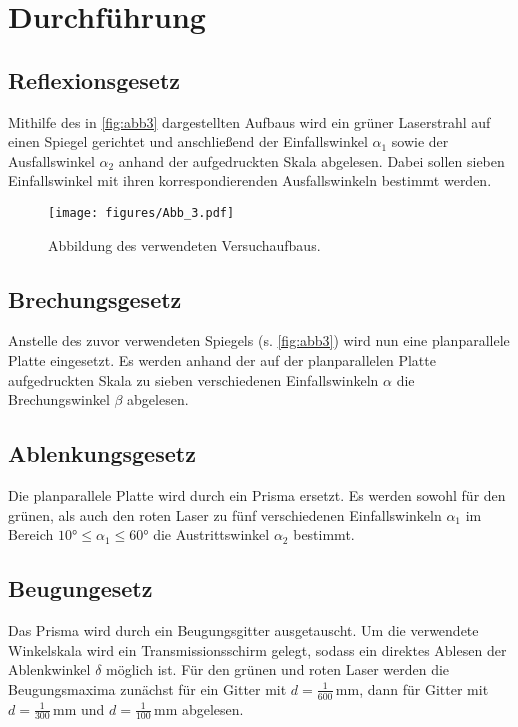 \section{Durchführung}
\label{sec:Durchführung}

\subsection*{Reflexionsgesetz}

Mithilfe des in \autoref{fig:abb3} dargestellten Aufbaus wird ein grüner Laserstrahl auf einen Spiegel gerichtet und anschließend der Einfallswinkel $\alpha_1$ sowie der Ausfallswinkel $\alpha_2$ anhand
der aufgedruckten Skala abgelesen. Dabei sollen sieben Einfallswinkel mit ihren korrespondierenden Ausfallswinkeln bestimmt werden.

\begin{figure}
    \centering
    \texttt{[image: figures/Abb\_3.pdf]}
    \caption{Abbildung des verwendeten Versuchaufbaus\cite{ap02}.}
    \label{fig:abb3}
\end{figure}

\subsection*{Brechungsgesetz}

Anstelle des zuvor verwendeten Spiegels (s. \autoref{fig:abb3}) wird nun eine planparallele Platte eingesetzt.
Es werden anhand der auf der planparallelen Platte aufgedruckten Skala zu sieben verschiedenen Einfallswinkeln $\alpha$ die Brechungswinkel $\beta$ abgelesen.


\subsection*{Ablenkungsgesetz}

Die planparallele Platte wird durch ein Prisma ersetzt.
Es werden sowohl für den grünen, als auch den roten Laser zu fünf verschiedenen Einfallswinkeln $\alpha_1$ im Bereich $10° \leq \alpha_1 \leq 60°$ die Austrittswinkel $\alpha_2$ bestimmt.


\subsection*{Beugungesetz}

Das Prisma wird durch ein Beugungsgitter ausgetauscht.
Um die verwendete Winkelskala wird ein Transmissionsschirm gelegt, sodass ein direktes Ablesen der Ablenkwinkel $\delta$ möglich ist.
Für den grünen und roten Laser werden die Beugungsmaxima zunächst für ein Gitter mit $d = \frac{1}{600} \, \unit{\milli\meter}$, dann für Gitter mit $d = \frac{1}{300} \, \unit{\milli\meter}$ und
$d = \frac{1}{100} \, \unit{\milli\meter}$ abgelesen.
